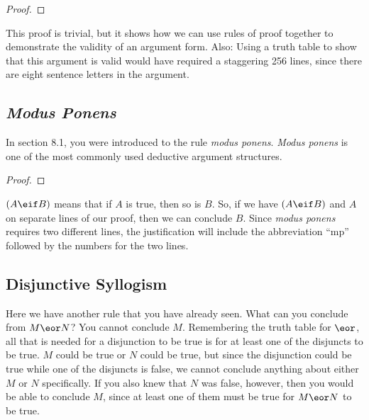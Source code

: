 \begin{proof}

	 
	 
	 
\end{proof}

This proof is trivial, but it shows how we can use rules of proof together to demonstrate the validity of an argument form. Also: Using a truth table to show that this argument is valid would have required a staggering 256 lines, since there are eight sentence letters in the argument.


\subsection{\emph{Modus Ponens}}

In section 8.1, you were introduced to the rule \emph{modus ponens}. \emph{Modus ponens} is one of the most commonly used deductive argument structures.

\begin{proof}
	 
\end{proof}

$(A\eif B)$ means that if $A$ is true, then so is $B$. So, if we have $(A\eif B)$ and $A$ on separate lines of our proof, then we can conclude $B$. Since \emph{modus ponens} requires two different lines, the justification will include the abbreviation ``mp'' followed by the numbers for the two lines.

\subsection{Disjunctive Syllogism}

Here we have another rule that you have already seen. What can you conclude from $M \eor N$? You cannot conclude $M$. Remembering the truth table for $\eor$, all that is needed for a disjunction to be true is for at least one of the disjuncts to be true. $M$ could be true or $N$ could be true, but since the disjunction could be true while one of the disjuncts is false, we cannot conclude anything about either $M$ or $N$ specifically. If you also knew that $N$ was false, however, then you would be able to conclude $M$, since at least one of them must be true for $M \eor N$ to be true.

